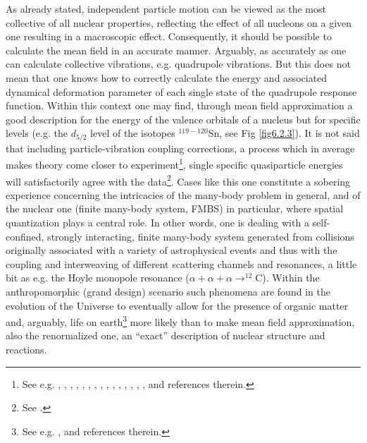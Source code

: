   
  As already stated, independent particle motion can be viewed as the most collective of all nuclear properties, reflecting the effect of all nucleons on a given one resulting in a macroscopic effect. Consequently, it should be possible to calculate the mean field in an accurate manner. Arguably, as accurately as one can calculate collective vibrations, e.g. quadrupole vibrations. But this does not mean that one knows how to correctly calculate the energy and associated dynamical deformation parameter of each single state of the quadrupole response function. Within this context one may find, through mean field approximation a good description for the energy of the valence orbitals of a nucleus but for  specific levels (e.g. the $d_{5/2}$ level of the isotopes $^{119-120}$Sn, see Fig \ref{fig6.2.3}). It is not said that  including  particle-vibration coupling corrections, a process which in average makes theory come closer to experiment\footnote{See e.g. \cite{Bohr:75}, \cite{Bohr:77}, \cite{Hamamoto:77}, \cite{Bes:77c}, \cite{Barnes:72}, \cite{Reich:74}, \cite{Hamamoto:76}, \cite{Bortignon:77}, \cite{Bernard:81}, \cite{Mahaux:85}, \cite{Bes:71,Flynn:71}, \cite{Bortignon:76}, \cite{Bes:88}, \cite{Barranco:87b}, \cite{Vinh:95}, \cite{Barranco:01,Orrigo:09} and references therein.}, single specific quasiparticle energies will satisfactorily agree  with the data\footnote{See \cite{Tarpanov:14}.}. Cases like this one constitute a sobering experience concerning the intricacies of the many-body problem in general, and of the nuclear one (finite many-body system, FMBS) in particular, where spatial quantization plays a central role. In other words, one is dealing with a self-confined, strongly interacting, finite many-body system generated from collisions originally associated  with a variety of astrophysical events and thus with  the coupling and interweaving of different scattering channels and resonances, a little bit as e.g. the Hoyle monopole resonance ($\alpha+\alpha+\alpha\rightarrow^{12}$C). Within the anthropomorphic (grand design) scenario such phenomena are found in the evolution of the Universe to eventually allow for the presence of organic matter and, arguably, life on earth\footnote{See e.g. \cite{Rees:00}, \cite{Meissner:15} and references therein.} more likely than to make mean field approximation, also the renormalized one, an ``exact'' description of nuclear structure and reactions.
 
 
